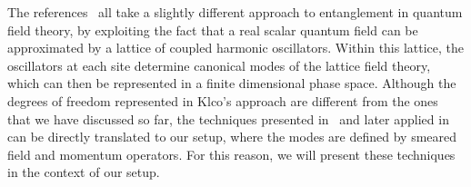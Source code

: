 \documentclass[letterpaper,12pt,titlepage,oneside,final]{book}
\begin{document}
The references~\cite{KlcoUVIR,KlcoEntStrQFTI,KlcoEntStrQFTII,KlcoEntAllDist} all take a slightly different approach to entanglement in quantum field theory, by exploiting the fact that a real scalar quantum field can be approximated by a lattice of coupled harmonic oscillators. Within this lattice, the oscillators at each site determine canonical modes of the lattice field theory, which can then be represented in a finite dimensional phase space. Although the degrees of freedom represented in Klco's approach are different from the ones that we have discussed so far, the techniques presented in~\cite{KlcoEntStrQFTI} and later applied in~\cite{KlcoUVIR,KlcoEntStrQFTII,KlcoEntAllDist} can be directly translated to our setup, where the modes are defined by smeared field and momentum operators. For this reason, we will present these techniques in the context of our setup.
\end{document}
